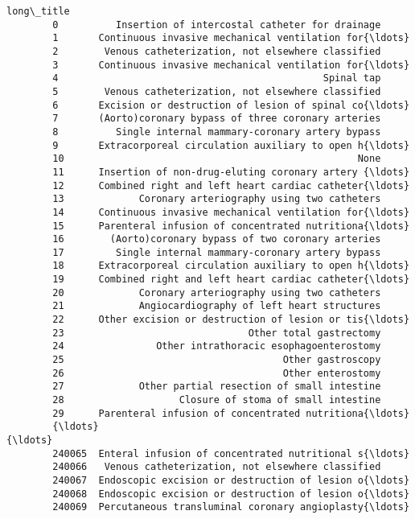 \documentclass[11pt]{article}
\begin{document}
\begin{Verbatim}[commandchars=\\\{\}]
                                                       long\_title  
        0          Insertion of intercostal catheter for drainage  
        1       Continuous invasive mechanical ventilation for{\ldots}  
        2        Venous catheterization, not elsewhere classified  
        3       Continuous invasive mechanical ventilation for{\ldots}  
        4                                              Spinal tap  
        5        Venous catheterization, not elsewhere classified  
        6       Excision or destruction of lesion of spinal co{\ldots}  
        7       (Aorto)coronary bypass of three coronary arteries  
        8          Single internal mammary-coronary artery bypass  
        9       Extracorporeal circulation auxiliary to open h{\ldots}  
        10                                                   None  
        11      Insertion of non-drug-eluting coronary artery {\ldots}  
        12      Combined right and left heart cardiac catheter{\ldots}  
        13             Coronary arteriography using two catheters  
        14      Continuous invasive mechanical ventilation for{\ldots}  
        15      Parenteral infusion of concentrated nutritiona{\ldots}  
        16        (Aorto)coronary bypass of two coronary arteries  
        17         Single internal mammary-coronary artery bypass  
        18      Extracorporeal circulation auxiliary to open h{\ldots}  
        19      Combined right and left heart cardiac catheter{\ldots}  
        20             Coronary arteriography using two catheters  
        21             Angiocardiography of left heart structures  
        22      Other excision or destruction of lesion or tis{\ldots}  
        23                                Other total gastrectomy  
        24                Other intrathoracic esophagoenterostomy  
        25                                      Other gastroscopy  
        26                                      Other enterostomy  
        27             Other partial resection of small intestine  
        28                    Closure of stoma of small intestine  
        29      Parenteral infusion of concentrated nutritiona{\ldots}  
        {\ldots}                                                   {\ldots}  
        240065  Enteral infusion of concentrated nutritional s{\ldots}  
        240066   Venous catheterization, not elsewhere classified  
        240067  Endoscopic excision or destruction of lesion o{\ldots}  
        240068  Endoscopic excision or destruction of lesion o{\ldots}  
        240069  Percutaneous transluminal coronary angioplasty{\ldots}  

\end{Verbatim}
\end{document}
